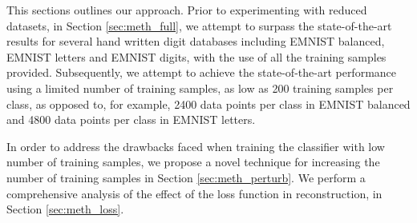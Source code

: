 This sections outlines our approach. Prior to experimenting with reduced datasets, in Section \ref{sec:meth_full}, we attempt to surpass the state-of-the-art results for several hand written digit databases including EMNIST balanced, EMNIST letters and EMNIST digits, with the use of all the training samples provided. Subsequently, we attempt to achieve the state-of-the-art performance using a limited number of training samples, as low as 200 training samples per class, as opposed to, for example, 2400 data points per class in EMNIST balanced and 4800 data points per class in EMNIST letters.

In order to address the drawbacks faced when training the classifier with low number of training samples, we propose a novel technique for increasing the number of training samples in Section \ref{sec:meth_perturb}. We perform a comprehensive analysis of the effect of the loss function in reconstruction, in Section \ref{sec:meth_loss}.